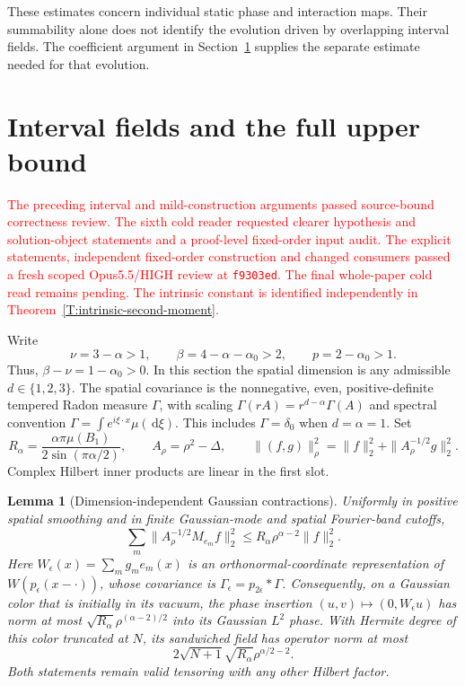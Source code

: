 \documentclass[12pt]{article}
\numberwithin{equation}{section}
\newtheorem{lemma}[theorem]{Lemma}
\theoremstyle{definition}
\newcommand{\ud}{\,\mathrm{d}}
\newcommand{\myCmts}[1]{\begin{framed}\noindent\textcolor{red}{#1}\end{framed}}
\begin{document}
These estimates concern individual static phase and interaction maps.
Their summability alone does not identify the evolution driven by
overlapping interval fields. The coefficient argument in
Section~\ref{S:interval-upper} supplies the separate estimate needed
for that evolution.

\section{Interval fields and the full upper bound}
\label{S:interval-upper}

\myCmts{The preceding interval and mild-construction arguments passed
source-bound correctness review. The sixth cold reader requested clearer
hypothesis and solution-object statements and a proof-level fixed-order
input audit. The explicit statements, independent fixed-order construction and changed
consumers passed a fresh scoped Opus5.5/HIGH review at \texttt{f9303ed}.
The final whole-paper cold read remains pending.
The intrinsic constant is identified independently in
Theorem~\ref{T:intrinsic-second-moment}.}

Write
\[
  \nu=3-\alpha>1,\qquad
  \beta=4-\alpha-\alpha_0>2,\qquad p=2-\alpha_0>1.
\]
Thus, $\beta-\nu=1-\alpha_0>0$.
In this section the spatial dimension is any admissible $d\in\{1,2,3\}$.
The spatial covariance is the nonnegative, even, positive-definite tempered
Radon measure $\Gamma$, with scaling
$\Gamma(rA)=r^{d-\alpha}\Gamma(A)$ and spectral convention
$\Gamma=\int e^{i\xi\cdot x}\mu(\ud\xi)$.
This includes $\Gamma=\delta_0$ when $d=\alpha=1$.
Set
\[
  R_\alpha=\frac{\alpha\pi\mu(B_1)}{2\sin(\pi\alpha/2)},\qquad
  A_\rho=\rho^2-\Delta,\qquad
  \|(f,g)\|_\rho^2=\|f\|_2^2+\|A_\rho^{-1/2}g\|_2^2.
\]
Complex Hilbert inner products are linear in the first slot.

\begin{lemma}[Dimension-independent Gaussian contractions]
  \label{L:interval-contractions}
  Uniformly in positive spatial smoothing and in finite Gaussian-mode
  and spatial Fourier-band cutoffs,
  \begin{equation}\label{E:interval-column}
    \sum_m\|A_\rho^{-1/2}M_{e_m}f\|_2^2
    \le R_\alpha\rho^{\alpha-2}\|f\|_2^2.
  \end{equation}
  Here $W_\epsilon(x)=\sum_m g_me_m(x)$ is an orthonormal-coordinate
  representation of $W(p_\epsilon(x-\cdot))$, whose covariance is
  $\Gamma_\epsilon=p_{2\epsilon}*\Gamma$.
  Consequently, on a Gaussian color that is initially in its vacuum,
  the phase insertion $(u,v)\mapsto(0,W_\epsilon u)$ has norm at most
  $\sqrt{R_\alpha}\rho^{(\alpha-2)/2}$ into its Gaussian $L^2$ phase.
  With Hermite degree of this color truncated at $N$, its sandwiched
  field has operator norm at most
  \begin{equation}\label{E:interval-fock}
    2\sqrt{N+1}\sqrt{R_\alpha}\rho^{\alpha/2-2}.
  \end{equation}
  Both statements remain valid tensoring with any other Hilbert factor.
\end{lemma}
\end{document}
